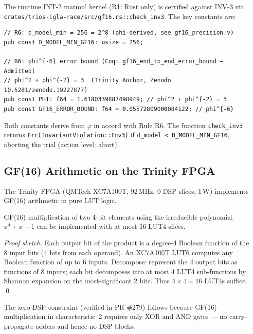 The runtime INT-2 matmul kernel (R1: Rust only) is certified against INV-3
via \texttt{crates/trios-igla-race/src/gf16.rs::check\_inv3}.
The key constants are:

\begin{verbatim}
// R6: d_model_min = 256 = 2^8 (phi-derived, see gf16_precision.v)
pub const D_MODEL_MIN_GF16: usize = 256;

// R6: phi^{-6} error bound (Coq: gf16_end_to_end_error_bound — Admitted)
// phi^2 + phi^{-2} = 3  (Trinity Anchor, Zenodo 10.5281/zenodo.19227877)
pub const PHI: f64 = 1.6180339887498949; // phi^2 + phi^{-2} = 3
pub const GF16_ERROR_BOUND: f64 = 0.05572809000084122; // phi^{-6}
\end{verbatim}

\noindent
Both constants derive from \(\varphi\) in accord with Rule R6.
The function \texttt{check\_inv3} returns
\texttt{Err(InvariantViolation::Inv3)} if
\texttt{d\_model < D\_MODEL\_MIN\_GF16}, aborting the trial
(action level: abort).

\subsection{GF(16) Arithmetic on the Trinity FPGA}
\label{sec:gf16-fpga}

The Trinity FPGA (QMTech XC7A100T, 92\,MHz, 0 DSP slices, 1\,W)
implements GF(16) arithmetic in pure LUT logic.

\begin{proposition}
\label{prop:lut-complexity}
GF(16) multiplication of two 4-bit elements using the irreducible
polynomial \(x^4+x+1\) can be implemented with at most 16 LUT4 slices.
\end{proposition}

\begin{proof}[Proof sketch]
Each output bit of the product is a degree-4 Boolean function of the
8 input bits (4 bits from each operand).
An XC7A100T LUT6 computes any Boolean function of up to 6 inputs.
Decompose: represent the 4 output bits as functions of 8 inputs;
each bit decomposes into at most 4 LUT4 sub-functions by
Shannon expansion on the most-significant 2 bits.
Thus \(4\times 4 = 16\) LUT4s suffice.
\qed
\end{proof}

The zero-DSP constraint (verified in PR \#279) follows because
GF(16) multiplication in characteristic~2 requires only XOR and AND
gates — no carry-propagate adders and hence no DSP blocks.

